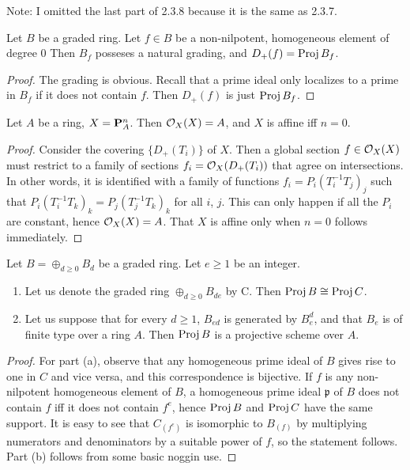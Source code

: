 Note: I omitted the last part of 2.3.8 because it is the same as 2.3.7.

\begin{exer}
	Let $B$ be a graded ring. Let $f \in B$ be a non-nilpotent, homogeneous
	element of degree $0$ Then $B_f$ posseses a natural grading, and $D_+(f)
	= \operatorname{Proj} B_f$.
\end{exer}
\begin{proof}
	The grading is obvious. Recall that a prime ideal only localizes to a
	prime in $B_f$ if it does not contain $f$. Then $D_+(f)$ is just $\operatorname{Proj}
	B_f$.
\end{proof}

\begin{exer}
	Let $A$ be a ring, $X = \mathbf{P}^n_A$. Then $\mathcal{O}_X(X) = A$, and $X$ is
	affine iff $n = 0$.
\end{exer}
\begin{proof}
	Consider the covering $\{D_+(T_i)\}$ of $X$. Then a global section $f
	\in \mathcal{O}_X(X)$ must restrict to a family of sections $f_i =
	\mathcal{O}_X(D_+(T_i))$ that agree on intersections. In other words, it is
	identified with a family of functions $f_i = P_i(T_i^{-1}T_j)_j$ such
	that $P_i(T_i^{-1}T_k)_k = P_j(T_j^{-1}T_k)_k$ for all $i$, $j$. This
	can only happen if all the $P_i$ are constant, hence $\mathcal{O}_X(X) = A$.
	That $X$ is affine only when $n = 0$ follows immediately.
\end{proof}

\begin{exer}
	Let $B = \oplus_{d \geq 0}B_d$ be a graded ring. Let $e \geq 1$ be an
	integer.
	\begin{enumerate}[label=(\alph*)]
		\item Let us denote the graded ring $\oplus_{d \geq 0}B_{de}$ by
			C. Then $\operatorname{Proj} B \cong \operatorname{Proj} C$.
		\item Let us suppose that for every $d \geq 1$, $B_{ed}$ is
			generated by $B_e^d$, and that $B_e$ is of finite type
			over a ring $A$. Then $\operatorname{Proj} B$ is a projective scheme
			over $A$.
	\end{enumerate}
\end{exer}
\begin{proof}
	For part (a), observe that any homogeneous prime ideal of $B$ gives rise
	to one in $C$ and vice versa, and this correspondence is bijective. If
	$f$ is any non-nilpotent homogeneous element of $B$, a homogeneous prime
	ideal $\mathfrak p$ of $B$ does not contain $f$ iff it does not contain
	$f^e$, hence $\operatorname{Proj} B$ and $\operatorname{Proj} C$ have the  same support. It is easy
	to see that $C_{(f^e)}$ is isomorphic to $B_{(f)}$ by multiplying
	numerators and denominators by a suitable power of $f$, so the statement
	follows.\\

	Part (b) follows from some basic noggin use.
\end{proof}

